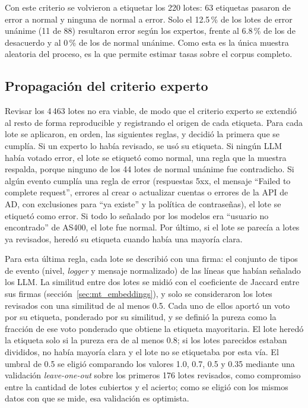 Con este criterio se volvieron a etiquetar los 220 lotes: 63 etiquetas pasaron de error a normal y ninguna de normal a error. Solo el 12.5\,\% de los lotes de error unánime (11 de 88) resultaron error según los expertos, frente al 6.8\,\% de los de desacuerdo y al 0\,\% de los de normal unánime. Como esta es la única muestra aleatoria del proceso, es la que permite estimar tasas sobre el corpus completo.

\subsection{Propagación del criterio experto}\label{subsec:met_propagacion}

Revisar los 4\,463 lotes no era viable, de modo que el criterio experto se extendió al resto de forma reproducible y registrando el origen de cada etiqueta. Para cada lote se aplicaron, en orden, las siguientes reglas, y decidió la primera que se cumplía. Si un experto lo había revisado, se usó su etiqueta. Si ningún LLM había votado error, el lote se etiquetó como normal, una regla que la muestra respalda, porque ninguno de los 44 lotes de normal unánime fue contradicho. Si algún evento cumplía una regla de error (respuestas 5xx, el mensaje ``Failed to complete request'', errores al crear o actualizar cuentas o errores de la API de AD, con exclusiones para ``ya existe'' y la política de contraseñas), el lote se etiquetó como error. Si todo lo señalado por los modelos era ``usuario no encontrado'' de AS400, el lote fue normal. Por último, si el lote se parecía a lotes ya revisados, heredó su etiqueta cuando había una mayoría clara.

Para esta última regla, cada lote se describió con una firma: el conjunto de tipos de evento (nivel, \textit{logger} y mensaje normalizado) de las líneas que habían señalado los LLM. La similitud entre dos lotes se midió con el coeficiente de Jaccard entre sus firmas (sección~\ref{sec:mt_embeddings}), y solo se consideraron los lotes revisados con una similitud de al menos 0.5. Cada uno de ellos aportó un voto por su etiqueta, ponderado por su similitud, y se definió la pureza como la fracción de ese voto ponderado que obtiene la etiqueta mayoritaria. El lote heredó la etiqueta solo si la pureza era de al menos 0.8; si los lotes parecidos estaban divididos, no había mayoría clara y el lote no se etiquetaba por esta vía. El umbral de 0.5 se eligió comparando los valores 1.0, 0.7, 0.5 y 0.35 mediante una validación \textit{leave-one-out} sobre los primeros 176 lotes revisados, como compromiso entre la cantidad de lotes cubiertos y el acierto; como se eligió con los mismos datos con que se mide, esa validación es optimista.


